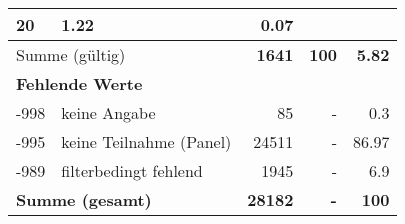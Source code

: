 \begin{longtable}{lXrrr}
       \num{20} &
       \num[round-mode=places,round-precision=2]{1.22} &
         \num[round-mode=places,round-precision=2]{0.07} \\
     \midrule
     \multicolumn{2}{l}{Summe (gültig)} &
       \textbf{\num{1641}} &
     \textbf{100} &
       \textbf{\num[round-mode=places,round-precision=2]{5.82}} \\
     \multicolumn{5}{l}{\textbf{Fehlende Werte}}\\
       -998 &
       keine Angabe &
         \num{85} &
        - &
         \num[round-mode=places,round-precision=2]{0.3} \\
       -995 &
       keine Teilnahme (Panel) &
         \num{24511} &
        - &
         \num[round-mode=places,round-precision=2]{86.97} \\
       -989 &
       filterbedingt fehlend &
         \num{1945} &
        - &
         \num[round-mode=places,round-precision=2]{6.9} \\
     \midrule
     \multicolumn{2}{l}{\textbf{Summe (gesamt)}} &
          \textbf{\num{28182}} &
        \textbf{-} &
        \textbf{100} \\
     \bottomrule
     \end{longtable}
     
